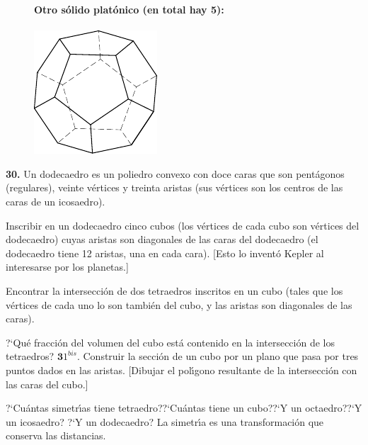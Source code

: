 \documentclass[12pt]{article}  %
\begin{document}
\noindent
\begin{figure}[h]
{\bf Otro s\'olido plat\'onico (en total hay 5):}\\
\\
\centering
\includegraphics{taskbook-14}\\[2pt]
\end{figure}

\bigskip
\noindent
{\bf 30.} Un dodecaedro es un poliedro convexo con doce caras que son pent\'agonos (regulares), veinte v\'ertices y treinta aristas
 (sus v\'ertices son los centros de las caras de un icosaedro).

Inscribir en un dodecaedro cinco cubos (los v\'ertices de cada cubo son v\'ertices del dodecaedro)
cuyas aristas son diagonales de las caras del dodecaedro (el dodecaedro tiene 12 aristas, una en cada cara).
[Esto lo invent\'o Kepler al interesarse por los planetas.] 

\bigskip
{} Encontrar la intersecci\'on de dos tetraedros inscritos en un cubo (tales que los v\'ertices de cada uno lo son tambi\'en del cubo, y las aristas son diagonales de las caras). 

?`Qu\'e fracci\'on del volumen del cubo est\'a contenido en la intersecci\'on de los tetraedros?
\newline\newline\quad
$\mathbf 31^{bis}.$ Construir la secci\'on de un cubo por un plano que pasa por tres puntos dados en las aristas.
[Dibujar el pol\'{\i}gono resultante de la intersecci\'on con las caras del cubo.]
\begin{figure}[h]
\centering
\end{figure}

 ?`Cu\'antas simetr\'{\i}as tiene tetraedro??`Cu\'antas tiene un cubo??`Y un octaedro??`Y un icosaedro? ?`Y un dodecaedro? La simetr\'{\i}a es una transformaci\'on que conserva las distancias.
\end{document}
